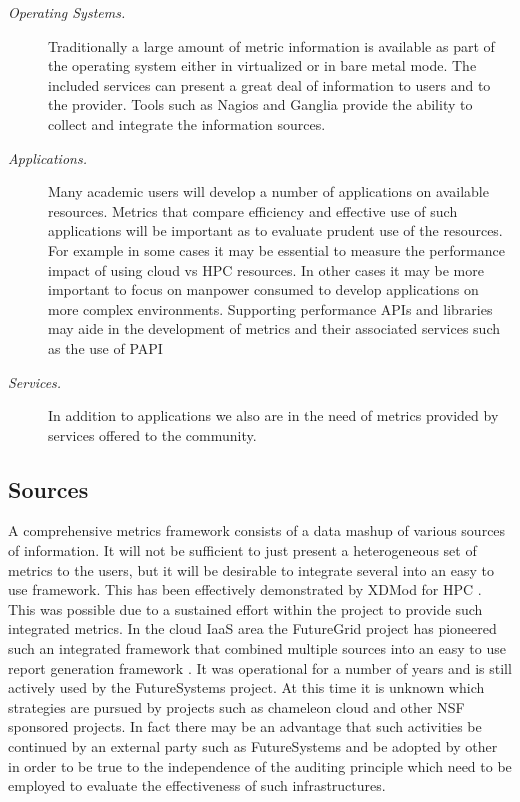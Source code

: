 \documentclass{sig-alternate-05-2015}
\begin{document}
\begin{description}
\item[\it Operating Systems.] Traditionally a large amount of metric
  information is available as part of the operating system either in
  virtualized or in bare metal mode. The included services can present a
  great deal of information to users and to the provider. Tools such
  as Nagios and Ganglia provide  the ability to collect and integrate
  the information sources.

\item[\it Applications.] Many academic users will develop a number of
  applications on available resources. Metrics that compare efficiency
  and effective use of such applications will be important as to
  evaluate prudent use of the resources. For example in some cases it
  may be essential to measure the performance impact of using cloud vs
  HPC resources. In other cases it may be more important to focus on
  manpower consumed to develop applications on more complex
  environments. Supporting performance APIs and libraries may aide in
  the development of metrics and their associated services such as the
  use of PAPI \cite{papi2014,papi-web,JohnNelsonAnalyzingPAPI}

\item[\it Services.] In addition to applications we also are in the
  need of metrics provided by services offered to the community. 

\end{description}

\subsection{Sources}

A comprehensive metrics framework consists of a data mashup of various
sources of information. It will not be sufficient to just present a
heterogeneous set of metrics to the users, but it will be desirable to
integrate several into an easy to use framework. This has been
effectively demonstrated by XDMod for HPC
\cite{las14cloudmeshmultiple,las14Impact,las12xdmod-kernel}. This was
possible due to a sustained effort within the project to provide such
integrated metrics. In the cloud IaaS area the FutureGrid project has
pioneered such an integrated framework that combined multiple sources
into an easy to use report generation framework
\cite{LeeFGresource}. It was operational for a number of years and is
still actively used by the FutureSystems project. At this time it is
unknown which strategies are pursued by projects such as chameleon
cloud and other NSF sponsored projects.  In fact there may be an
advantage that such activities be continued by an external party such
as FutureSystems and be adopted by other in order to be true to the
independence of the auditing principle which need to be employed to
evaluate the effectiveness of such infrastructures.
\end{document}
